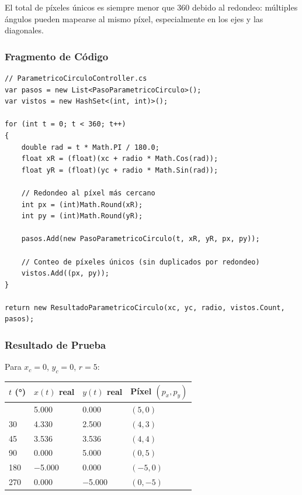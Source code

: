 \documentclass[
  spanish,
  a4paper,
  12pt,
]{article}
\newcounter{none} %
\begin{document}
El total de píxeles únicos es siempre menor que 360 debido al redondeo:
múltiples ángulos pueden mapearse al mismo píxel, especialmente en los
ejes y las diagonales.

\subsubsection{Fragmento de Código}\label{fragmento-de-cuxf3digo-4}

\begin{lstlisting}
// ParametricoCirculoController.cs
var pasos = new List<PasoParametricoCirculo>();
var vistos = new HashSet<(int, int)>();

for (int t = 0; t < 360; t++)
{
    double rad = t * Math.PI / 180.0;
    float xR = (float)(xc + radio * Math.Cos(rad));
    float yR = (float)(yc + radio * Math.Sin(rad));

    // Redondeo al píxel más cercano
    int px = (int)Math.Round(xR);
    int py = (int)Math.Round(yR);

    pasos.Add(new PasoParametricoCirculo(t, xR, yR, px, py));

    // Conteo de píxeles únicos (sin duplicados por redondeo)
    vistos.Add((px, py));
}

return new ResultadoParametricoCirculo(xc, yc, radio, vistos.Count, pasos);
\end{lstlisting}

\subsubsection{Resultado de Prueba}\label{resultado-de-prueba-4}

Para \(x_c=0\), \(y_c=0\), \(r=5\):

{\def\LTcaptype{none} %
\begin{longtable}[]{@{}llll@{}}
\toprule\noalign{}
\(t\) (°) & \(x(t)\) real & \(y(t)\) real & Píxel \((p_x, p_y)\) \\
\midrule\noalign{}
\endhead
\bottomrule\noalign{}
\endlastfoot
0 & 5.000 & 0.000 & \((5, 0)\) \\
30 & 4.330 & 2.500 & \((4, 3)\) \\
45 & 3.536 & 3.536 & \((4, 4)\) \\
90 & 0.000 & 5.000 & \((0, 5)\) \\
180 & −5.000 & 0.000 & \((−5, 0)\) \\
270 & 0.000 & −5.000 & \((0, −5)\) \\
\end{longtable}
}
\end{document}

